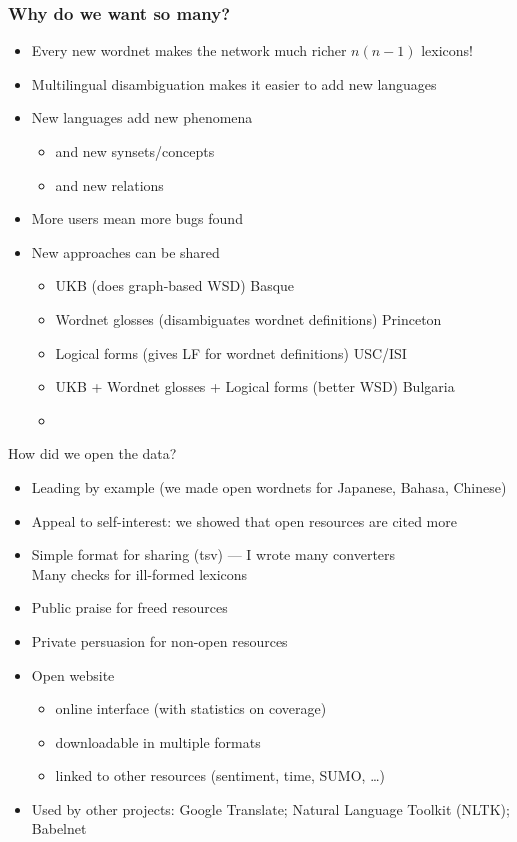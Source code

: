 \documentclass{beamer}
\begin{document}
\begin{frame}{}
\frametitle{Why do we want so many?}
\begin{itemize}
\item Every new wordnet makes the network much richer $n(n-1)$ lexicons!
\item Multilingual disambiguation makes it easier to add new languages
\item New languages add new phenomena 
  \begin{itemize}
  \item and new synsets/concepts
  \item and new relations
  \end{itemize}
\item More users mean more bugs found
\item New approaches can be shared
  \begin{itemize}
  \item UKB  (does graph-based WSD) \hfill Basque
  \item Wordnet glosses  (disambiguates wordnet definitions) \hfill Princeton 
  \item Logical forms  (gives LF for wordnet definitions) \hfill USC/ISI
  \item UKB + Wordnet glosses + Logical forms  (better WSD) \hfill Bulgaria
  \item[\ldots]
  \end{itemize}
\end{itemize}
\end{frame}

\begin{frame}{How did we open the data?}
  \begin{itemize}
  \item Leading by example (we made open wordnets for Japanese, Bahasa, Chinese)
  \item Appeal to self-interest: we showed that open resources are cited more
     \citep{Bond:Paik:2012}
  \item Simple format for sharing (tsv) --- I wrote many converters
    \\ Many checks for ill-formed lexicons
  \item Public praise for freed resources
  \item Private persuasion for non-open resources
  \item Open website 
    \begin{itemize}
    \item online interface (with statistics on coverage)
    \item downloadable in multiple formats
    \item linked to other resources (sentiment, time, SUMO, \ldots)
    \end{itemize}
  \item Used by other projects: Google Translate; 
    Natural Language Toolkit (NLTK); Babelnet
  \end{itemize}
\end{frame}
\end{document}
